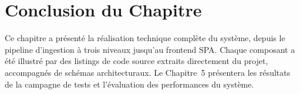 \section*{Conclusion du Chapitre}

Ce chapitre a pr\'{e}sent\'{e} la r\'{e}alisation technique compl\`{e}te du syst\`{e}me, depuis le pipeline d'ingestion \`{a} trois niveaux jusqu'au frontend SPA. Chaque composant a \'{e}t\'{e} illustr\'{e} par des listings de code source extraits directement du projet, accompagn\'{e}s de sch\'{e}mas architecturaux. Le Chapitre~5 pr\'{e}sentera les r\'{e}sultats de la campagne de tests et l'\'{e}valuation des performances du syst\`{e}me.

